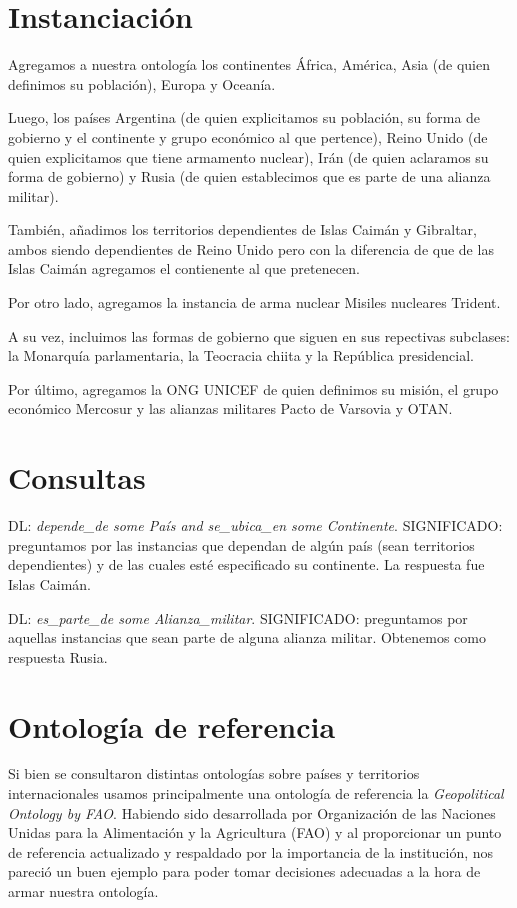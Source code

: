 \documentclass[11pt]{article}
\begin{document}
\section{Instanciación}

Agregamos a nuestra ontología los continentes África, América, Asia (de quien definimos su población), Europa y Oceanía. 

Luego, los países Argentina (de quien explicitamos su población, su forma de gobierno y el continente y grupo económico al que pertence), 
Reino Unido (de quien explicitamos que tiene armamento nuclear), Irán (de quien aclaramos su forma de gobierno) y Rusia (de quien establecimos que es parte de una alianza militar). 

También, añadimos los territorios dependientes de Islas Caimán y Gibraltar, ambos siendo dependientes de Reino Unido pero con la diferencia de que de las Islas Caimán agregamos el contienente al que pretenecen. 

Por otro lado, agregamos la instancia de arma nuclear Misiles nucleares Trident. 

A su vez, incluimos las formas de gobierno que siguen en sus repectivas subclases: la Monarquía parlamentaria, la Teocracia chiita y la República presidencial. 

Por último, agregamos la ONG UNICEF de quien definimos su misión, el grupo económico Mercosur y las alianzas militares Pacto de Varsovia y OTAN. 

\section{Consultas}

DL: \textit{depende\_de some País and se\_ubica\_en some Continente}. SIGNIFICADO: preguntamos por las instancias que dependan de algún país (sean territorios dependientes) y de las cuales esté especificado su continente. La respuesta fue Islas Caimán.
  
DL: \textit{es\_parte\_de some Alianza\_militar}. SIGNIFICADO: preguntamos por aquellas instancias que sean parte de alguna alianza militar. Obtenemos como respuesta Rusia.


\section{Ontología de referencia}
Si bien se consultaron distintas ontologías sobre países y territorios internacionales usamos 
principalmente una ontología de referencia la \textit{Geopolitical Ontology by FAO}. Habiendo sido 
desarrollada por Organización de las Naciones Unidas para la Alimentación y la Agricultura (FAO)
y al proporcionar un punto de referencia actualizado y respaldado por la importancia de la institución,
nos pareció un buen ejemplo para poder tomar decisiones adecuadas a la hora de armar nuestra ontología.
\end{document}
